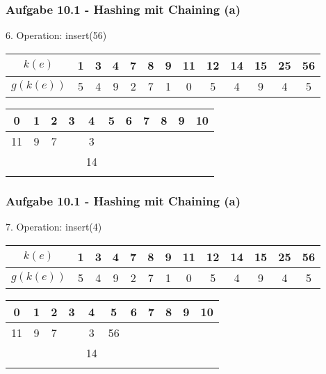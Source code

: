   \begin{frame}
    \frametitle{Aufgabe 10.1 - Hashing mit Chaining (a)}
    6. Operation: insert(56)
    \begin{center}
      \begin{tabular}{c|c|c|c|c|c|c|c|c|c|c|c|c}
        $k(e)$    & 1 & 3 & 4 & 7 & 8 & 9 & 11 & 12 & 14 & 15 & 25 & 56 \\
        \hline
        $g(k(e))$ & 5 & 4 & 9 & 2 & 7 & 1 & 0  & 5  & 4  & 9  & 4  & 5  \\
      \end{tabular}
  
      \bigskip
  
      \begin{tabular}{c|c|c|c|c|c|c|c|c|c|c}
        0  & 1 & 2 & 3 & 4  & 5 & 6 & 7 & 8 & 9 & 10 \\
        \hline
        11 & 9 & 7 &   & 3  &   &   &   &   &   &    \\
           &   &   &   & 14 &   &   &   &   &   &    \\
           &   &   &   &    &   &   &   &   &   &    \\
      \end{tabular}
    \end{center}
  \end{frame}
  
  \begin{frame}
    \frametitle{Aufgabe 10.1 - Hashing mit Chaining (a)}
    7. Operation: insert(4)
    \begin{center}
      \begin{tabular}{c|c|c|c|c|c|c|c|c|c|c|c|c}
        $k(e)$    & 1 & 3 & 4 & 7 & 8 & 9 & 11 & 12 & 14 & 15 & 25 & 56 \\
        \hline
        $g(k(e))$ & 5 & 4 & 9 & 2 & 7 & 1 & 0  & 5  & 4  & 9  & 4  & 5  \\
      \end{tabular}
  
      \bigskip
  
      \begin{tabular}{c|c|c|c|c|c|c|c|c|c|c}
        0  & 1 & 2 & 3 & 4  & 5  & 6 & 7 & 8 & 9 & 10 \\
        \hline
        11 & 9 & 7 &   & 3  & 56 &   &   &   &   &    \\
           &   &   &   & 14 &    &   &   &   &   &    \\
           &   &   &   &    &    &   &   &   &   &    \\
      \end{tabular}
    \end{center}
  \end{frame}
  
